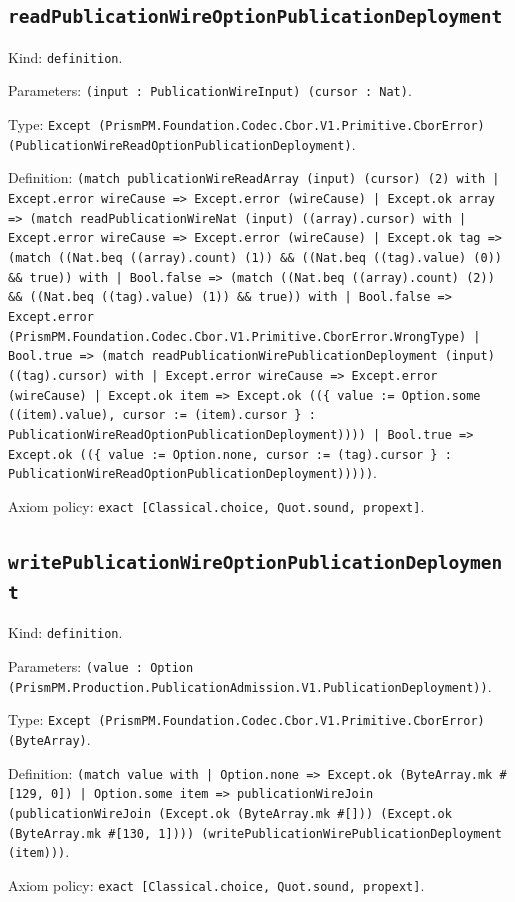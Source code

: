 \documentclass[11pt]{article}
\begin{document}
\subsection*{\texttt{readPublicationWireOptionPublicationDeployment}}
\noindent Kind: \texttt{definition}.\par
\noindent Parameters: \texttt{(input : PublicationWireInput) (cursor : Nat)}.\par
\noindent Type: \texttt{Except (PrismPM.Foundation.Codec.Cbor.V1.Primitive.CborError) (PublicationWireReadOptionPublicationDeployment)}.\par
\noindent Definition: \texttt{(match publicationWireReadArray (input) (cursor) (2) with | Except.error wireCause => Except.error (wireCause) | Except.ok array => (match readPublicationWireNat (input) ((array).cursor) with | Except.error wireCause => Except.error (wireCause) | Except.ok tag => (match ((Nat.beq ((array).count) (1)) \&\& ((Nat.beq ((tag).value) (0)) \&\& true)) with | Bool.false => (match ((Nat.beq ((array).count) (2)) \&\& ((Nat.beq ((tag).value) (1)) \&\& true)) with | Bool.false => Except.error (PrismPM.Foundation.Codec.Cbor.V1.Primitive.CborError.WrongType) | Bool.true => (match readPublicationWirePublicationDeployment (input) ((tag).cursor) with | Except.error wireCause => Except.error (wireCause) | Except.ok item => Except.ok ((\{ value := Option.some ((item).value), cursor := (item).cursor \} : PublicationWireReadOptionPublicationDeployment)))) | Bool.true => Except.ok ((\{ value := Option.none, cursor := (tag).cursor \} : PublicationWireReadOptionPublicationDeployment)))))}.\par
\noindent Axiom policy: \texttt{exact [Classical.choice, Quot.sound, propext]}.\par
\subsection*{\texttt{writePublicationWireOptionPublicationDeployment}}
\noindent Kind: \texttt{definition}.\par
\noindent Parameters: \texttt{(value : Option (PrismPM.Production.PublicationAdmission.V1.PublicationDeployment))}.\par
\noindent Type: \texttt{Except (PrismPM.Foundation.Codec.Cbor.V1.Primitive.CborError) (ByteArray)}.\par
\noindent Definition: \texttt{(match value with | Option.none => Except.ok (ByteArray.mk \#[129, 0]) | Option.some item => publicationWireJoin (publicationWireJoin (Except.ok (ByteArray.mk \#[])) (Except.ok (ByteArray.mk \#[130, 1]))) (writePublicationWirePublicationDeployment (item)))}.\par
\noindent Axiom policy: \texttt{exact [Classical.choice, Quot.sound, propext]}.\par
\end{document}
